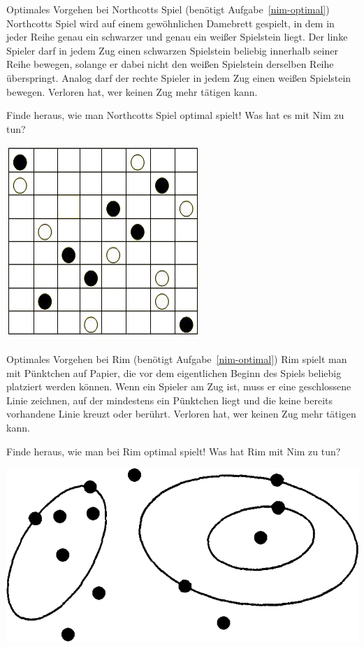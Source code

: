 \documentclass{zirkelblatt}
\begin{document}
\begin{aufgabe}{Optimales Vorgehen bei Northcotts Spiel
(benötigt Aufgabe~\ref{nim-optimal})}
Northcotts Spiel wird auf einem gewöhnlichen Damebrett gespielt, in dem in
jeder Reihe genau ein schwarzer und genau ein weißer Spielstein liegt.
Der linke Spieler darf in jedem Zug einen schwarzen Spielstein beliebig
innerhalb seiner Reihe bewegen, solange er dabei nicht den weißen Spielstein
derselben Reihe überspringt. Analog darf der rechte Spieler in jedem Zug einen
weißen Spielstein bewegen. Verloren hat, wer keinen Zug mehr tätigen kann.

Finde heraus, wie man Northcotts Spiel optimal spielt! Was hat es mit Nim zu tun?

\begin{center}
\includegraphics[scale=0.4]{northcott}
\end{center}
\end{aufgabe}

\begin{aufgabe}{Optimales Vorgehen bei Rim
(benötigt Aufgabe~\ref{nim-optimal})}
Rim spielt man mit Pünktchen auf Papier, die vor dem eigentlichen Beginn des
Spiels beliebig platziert werden können. Wenn ein Spieler am Zug ist, muss er
eine geschlossene Linie zeichnen, auf der mindestens ein Pünktchen liegt und
die keine bereits vorhandene Linie kreuzt oder berührt. Verloren hat, wer
keinen Zug mehr tätigen kann.

Finde heraus, wie man bei Rim optimal spielt! Was hat Rim mit Nim zu tun?

\begin{center}
\includegraphics[scale=0.3]{rim}
\end{center}
\end{aufgabe}
\end{document}
